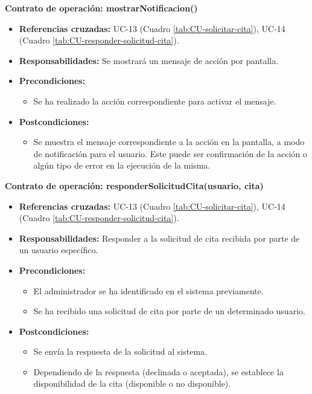 \textbf{Contrato de operación: mostrarNotificacion()}
\begin{itemize}
\item \textbf{Referencias cruzadas:} UC-13 (Cuadro \ref{tab:CU-solicitar-cita}), UC-14 (Cuadro \ref{tab:CU-responder-solicitud-cita}).
\item \textbf{Responsabilidades:} Se mostrará un mensaje de acción por pantalla.
\item \textbf{Precondiciones:} 
 \begin{itemize}
\item Se ha realizado la acción correspondiente para activar el mensaje.
\end {itemize}
\item \textbf{Postcondiciones:} 
 \begin{itemize}
\item Se muestra el mensaje correspondiente a la acción en la pantalla, a modo de notificación para el usuario. Este puede ser confirmación de la acción o algún tipo de error en la ejecución de la misma.
\end {itemize}
\end {itemize}

\textbf{Contrato de operación: responderSolicitudCita(usuario, cita)}
\begin{itemize}
\item \textbf{Referencias cruzadas:} UC-13 (Cuadro \ref{tab:CU-solicitar-cita}), UC-14 (Cuadro \ref{tab:CU-responder-solicitud-cita}).
\item \textbf{Responsabilidades:} Responder a la solicitud de cita recibida por parte de un usuario específico.
\item \textbf{Precondiciones:} 
 \begin{itemize}
\item El administrador se ha identificado en el sistema previamente.
\item Se ha recibido una solicitud de cita por parte de un determinado usuario.
\end {itemize}
\item \textbf{Postcondiciones:} 
 \begin{itemize}
\item Se envía la respuesta de la solicitud al sistema.
\item Dependiendo de la respuesta (declinada o aceptada), se establece la disponibilidad de la cita (disponible o no disponible).
\end {itemize}
\end {itemize}

